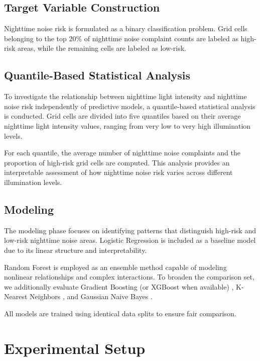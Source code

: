 \documentclass[conference]{IEEEtran}
\begin{document}
\subsection{Target Variable Construction}

Nighttime noise risk is formulated as a binary classification problem.
Grid cells belonging to the top 20\% of nighttime noise complaint counts are labeled
as high-risk areas, while the remaining cells are labeled as low-risk.

\subsection{Quantile-Based Statistical Analysis}

To investigate the relationship between nighttime light intensity and nighttime
noise risk independently of predictive models, a quantile-based statistical analysis
is conducted.
Grid cells are divided into five quantiles based on their average nighttime light
intensity values, ranging from very low to very high illumination levels.

For each quantile, the average number of nighttime noise complaints and the proportion
of high-risk grid cells are computed.
This analysis provides an interpretable assessment of how nighttime noise risk varies
across different illumination levels.

\subsection{Modeling}

The modeling phase focuses on identifying patterns that distinguish high-risk and
low-risk nighttime noise areas.
Logistic Regression is included as a baseline model due to its linear structure and
interpretability.

Random Forest \cite{breiman2001random} is employed as an ensemble method capable of modeling nonlinear
relationships and complex interactions.
To broaden the comparison set, we additionally evaluate Gradient Boosting (or XGBoost when available)
\cite{chen2016xgboost}, K-Nearest Neighbors \cite{cover1967nearest}, and Gaussian Naive Bayes \cite{rish2001naive}.

All models are trained using identical data splits to ensure fair comparison.

\section{Experimental Setup}
\end{document}
